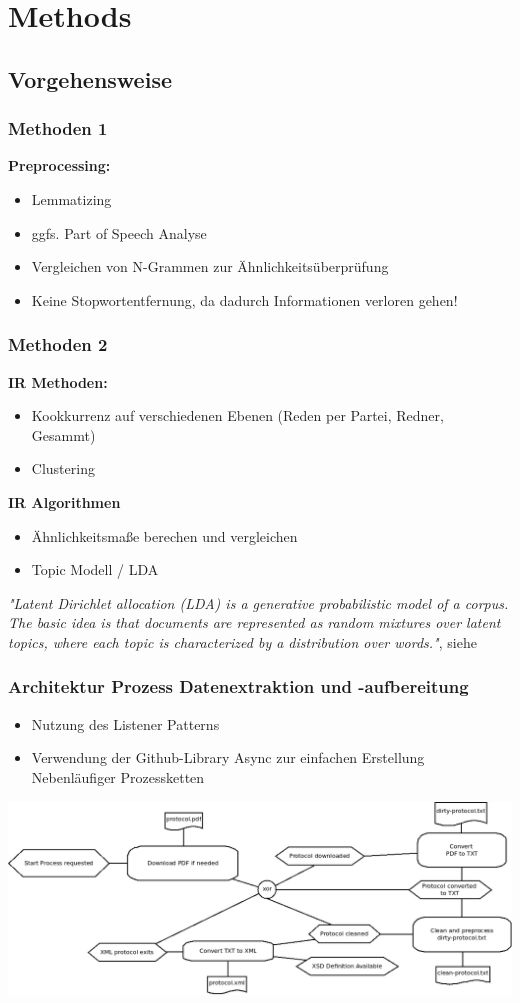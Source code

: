 \documentclass[11pt, a4paper]{beamer}
\begin{document}
\section{Methods} 
\subsection{Vorgehensweise}
\begin{frame}
\frametitle{Methoden 1}
\textbf{Preprocessing:}
\begin{itemize}
\item Lemmatizing
\item ggfs. Part of Speech Analyse  
\item Vergleichen von N-Grammen zur Ähnlichkeitsüberprüfung
\item Keine Stopwortentfernung, da dadurch Informationen verloren gehen!
\end{itemize}
\end{frame}

\begin{frame}
\frametitle{Methoden 2}
\textbf{IR Methoden:}
\begin{itemize}
\item Kookkurrenz auf verschiedenen Ebenen (Reden per Partei, Redner, Gesammt)
\item Clustering
\end{itemize}
\textbf{IR Algorithmen}
\begin{itemize}
\item Ähnlichkeitsmaße berechen und vergleichen 
\item Topic Modell / LDA 
\end{itemize}
\textit {"Latent Dirichlet allocation (LDA) is a generative probabilistic
	model of a corpus. The basic idea is that documents are represented as
 	random mixtures over latent topics, where each topic is characterized by a
 	distribution over words."}, siehe \cite{blatent}
%  	
\end{frame} 

\begin{frame}
  \frametitle{Architektur Prozess Datenextraktion und -aufbereitung }
  \begin{itemize}
  \item Nutzung des Listener Patterns \cite{javainsel9}
  \item Verwendung der Github-Library Async \cite{async} zur einfachen Erstellung Nebenläufiger Prozessketten
  \end{itemize}  
  \begin{center}
    \includegraphics[width=1\textwidth]{../../doc/process-overview.png}
  \end{center}
\end{frame}
\end{document}
